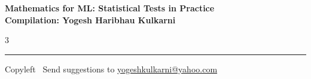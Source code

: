 \documentclass[8pt,landscape]{article}
\begin{document}
\footnotesize


\begin{center}
\Large{\textbf{Mathematics for ML: Statistical Tests in Practice\\ Compilation: Yogesh Haribhau Kulkarni}}
\end{center}

\begin{multicols}{3}

\end{multicols}

\rule{\linewidth}{0.25pt}
\scriptsize
Copyleft \textcopyleft\  Send suggestions to
\href{http://www.yogeshkulkarni.com}{yogeshkulkarni@yahoo.com}
\end{document}
